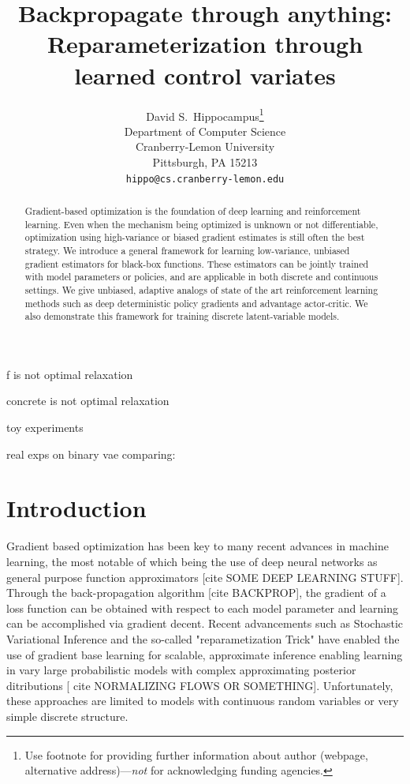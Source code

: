 \documentclass{article}
\title{Backpropagate through anything:\\ Reparameterization through learned control variates}
\author{
  David S.~Hippocampus\thanks{Use footnote for providing further
    information about author (webpage, alternative
    address)---\emph{not} for acknowledging funding agencies.} \\
  Department of Computer Science\\
  Cranberry-Lemon University\\
  Pittsburgh, PA 15213 \\
  \texttt{hippo@cs.cranberry-lemon.edu} \\
}
\begin{document}
\maketitle
\begin{abstract}
Gradient-based optimization is the foundation of deep learning and reinforcement learning.
Even when the mechanism being optimized is unknown or not differentiable, optimization using high-variance or biased gradient estimates is still often the best strategy.
We introduce a general framework for learning low-variance, unbiased gradient estimators for black-box functions.
These estimators can be jointly trained with model parameters or policies, and are applicable in both discrete and continuous settings.
We give unbiased, adaptive analogs of state of the art reinforcement learning methods such as deep deterministic policy gradients and advantage actor-critic.
We also demonstrate this framework for training discrete latent-variable models.
\end{abstract}



f is not optimal relaxation

concrete is not optimal relaxation

toy experiments

real exps on binary vae comparing:







\section{Introduction}
Gradient based optimization has been key to many recent advances in machine learning, the most notable of which being the use of deep neural networks as general purpose function approximators [cite SOME DEEP LEARNING STUFF].
Through the back-propagation algorithm [cite BACKPROP], the gradient of a loss function can be obtained with respect to each model parameter and learning can be accomplished via gradient decent.
Recent advancements such as Stochastic Variational Inference \cite{SVI} and the so-called "reparametization Trick" \cite{VAE} have enabled the use of gradient base learning for scalable, approximate inference enabling learning in vary large probabilistic models with complex approximating posterior ditributions [ cite NORMALIZING FLOWS OR SOMETHING].
Unfortunately, these approaches are limited to models with continuous random variables or very simple discrete structure. 
\end{document}
